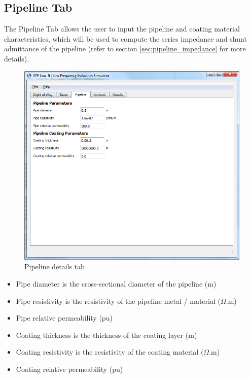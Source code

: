 \documentclass{article}
\begin{document}
\subsection{Pipeline Tab}
The Pipeline Tab allows the user to input the pipeline and coating material characteristics, which will be used to compute the series impedance and shunt admittance of the pipeline (refer to section \ref{sec:pipeline_impedance} for more details).

\begin{figure}[!htp]
\begin{center}
\caption{Pipeline details tab}
\label{fig:pipeline}
\includegraphics[width=0.9\linewidth]{./Figures/pipeline.png}
\end{center}
\end{figure}

\begin{itemize}
\item Pipe diameter is the cross-sectional diameter of the pipeline (m)
\item Pipe resistivity is the resistivity of the pipeline metal / material ($\Omega$.m)
\item Pipe relative permeability (pu)
\item Coating thickness is the thickness of the coating layer (m)
\item Coating resistivity is the resistivity of the coating material ($\Omega$.m)
\item Coating relative permeability (pu)
\end{itemize}
\end{document}
